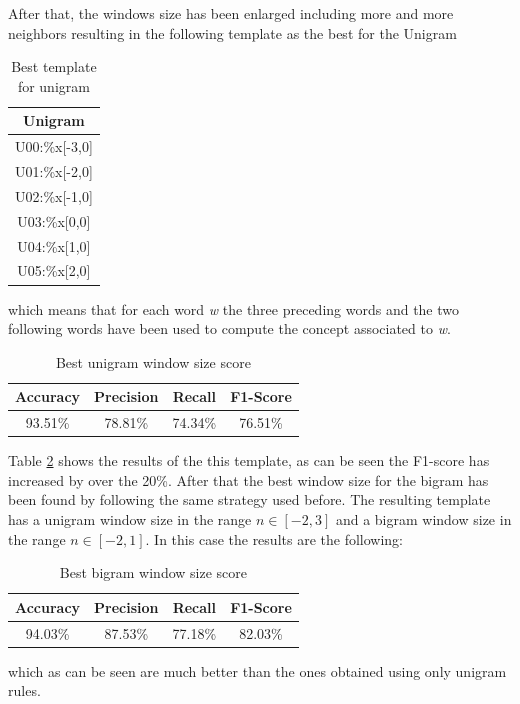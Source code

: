 \documentclass[11pt,a4paper]{article}
\begin{document}
After that, the windows size has been enlarged including more and more neighbors resulting in the following template as the best for the Unigram
\begin{table}[H]
    \begin{center}
        \begin{tabular}{|c|}
            \hline \bf Unigram \\ \hline
            U00:\%x[-3,0] \\
            U01:\%x[-2,0] \\
            U02:\%x[-1,0] \\
            U03:\%x[0,0] \\
            U04:\%x[1,0] \\
            U05:\%x[2,0] \\
            \hline
        \end{tabular}
    \end{center}
    \caption{\label{t2} Best template for unigram}
\end{table}
which means that for each word \textit{w} the three preceding words and the two following words have been used to compute the concept associated to \textit{w}.
\begin{table}[h]
    \begin{center}
        \begin{tabular}{|c|c|c|c|}
            \hline \bf Accuracy &   \bf Precision &  \bf Recall &  \bf F1-Score   \\ \hline
            93.51\% & 78.81\% & 74.34\% & 76.51\%\\
            \hline
        \end{tabular}
    \end{center}
    \caption{\label{t3} Best unigram window size score}
\end{table}

Table \ref{t3} shows the results of the this template, as can be seen the F1-score has increased by over the 20\%.
After that the best window size for the bigram has been found by following the same strategy used before. The resulting template has a unigram  window size in the range $n \in [-2,3]$ and a bigram window size in the range $n \in [-2,1]$. In this case the results are the following:
\begin{table}[H]
    \begin{center}
        \begin{tabular}{|c|c|c|c|}
            \hline \bf Accuracy &   \bf Precision &  \bf Recall &  \bf F1-Score   \\ \hline
            94.03\% & 87.53\% & 77.18\% & 82.03\%\\
            \hline
        \end{tabular}
    \end{center}
    \caption{\label{t31} Best bigram window size score}
\end{table}
which as can be seen are much better than the ones obtained using only unigram rules.
\end{document}
